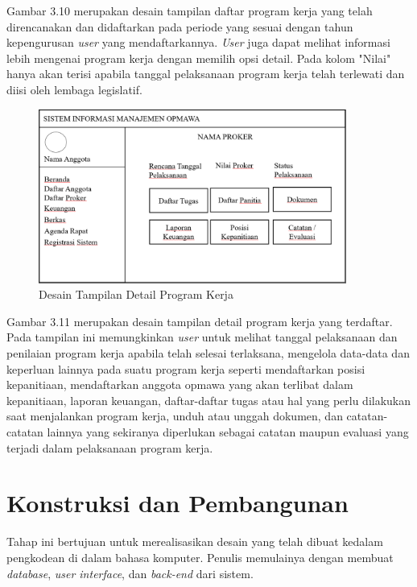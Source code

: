 Gambar 3.10 merupakan desain tampilan daftar program kerja yang telah direncanakan dan didaftarkan pada periode yang sesuai dengan tahun kepengurusan \textit{user} yang mendaftarkannya. \textit{User} juga dapat melihat informasi lebih mengenai program kerja dengan memilih opsi detail. Pada kolom "Nilai" hanya akan terisi apabila tanggal pelaksanaan program kerja telah terlewati dan diisi oleh lembaga legislatif.

\begin{figure}[H]
	\centering
	\includegraphics[width=0.9\textwidth]{gambar/tampilandetailproker}
	\caption{Desain Tampilan Detail Program Kerja}
	\label{Tampilan_detail_proker}
\end{figure}

Gambar 3.11 merupakan desain tampilan detail program kerja yang terdaftar. Pada tampilan ini memungkinkan \textit{user} untuk melihat tanggal pelaksanaan dan penilaian program kerja apabila telah selesai terlaksana, mengelola data-data dan keperluan lainnya pada suatu program kerja seperti mendaftarkan posisi kepanitiaan, mendaftarkan anggota opmawa yang akan terlibat dalam kepanitiaan, laporan keuangan, daftar-daftar tugas atau hal yang perlu dilakukan saat menjalankan program kerja, unduh atau unggah dokumen, dan catatan-catatan lainnya yang sekiranya diperlukan sebagai catatan maupun evaluasi yang terjadi dalam pelaksanaan program kerja.

\section{Konstruksi dan Pembangunan}

Tahap ini bertujuan untuk merealisasikan desain yang telah dibuat kedalam pengkodean di dalam bahasa komputer. Penulis memulainya dengan membuat \textit{database}, \textit{user interface}, dan \textit{back-end} dari sistem.

